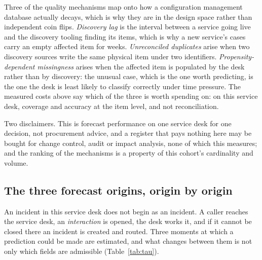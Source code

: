 Three of the quality mechanisms map onto how a configuration management
database actually decays, which is why they are in the design space rather
than independent coin flips. \emph{Discovery lag} is the interval between a
service going live and the discovery tooling finding its items, which is why a
new service's cases carry an empty affected item for weeks. \emph{Unreconciled
duplicates} arise when two discovery sources write the same physical item
under two identifiers. \emph{Propensity-dependent missingness} arises when the
affected item is populated by the desk rather than by discovery: the unusual
case, which is the one worth predicting, is the one the desk is least likely
to classify correctly under time pressure. The measured costs above say which
of the three is worth spending on: on this service desk, coverage and accuracy at
the item level, and not reconciliation.

Two disclaimers. This is forecast performance on one service desk for one
decision, not procurement advice, and a register that pays nothing here may be
bought for change control, audit or impact analysis, none of which this
measures; and the ranking of the mechanisms is a property of this cohort's
cardinality and volume.

\subsection{The three forecast origins, origin by origin}
\label{app:taudetail}


An incident in this service desk does not begin as an incident. A caller reaches the
service desk, an \emph{interaction} is opened, the desk works it, and if it
cannot be closed there an incident is created and routed. Three moments at
which a prediction could be made are estimated, and what changes between them
is not only which fields are admissible (Table~\ref{tab:tau}).

